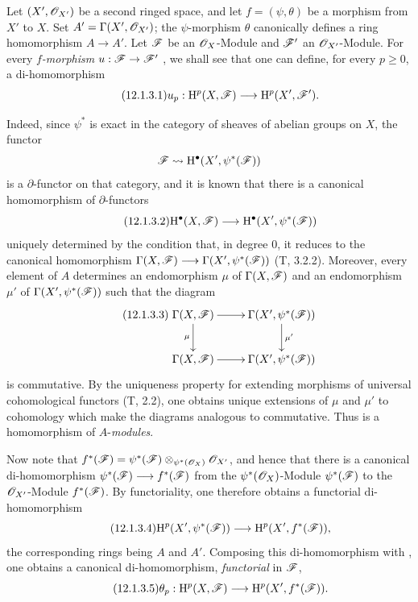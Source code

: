 \begin{env}[12.1.3]
\label{0.12.1.3}
Let $(X',\mathscr{O}_{X'})$ be a second ringed space, and let
$f=(\psi,\theta)$ be a morphism from $X'$ to $X$.
Set $A'=\Gamma(X',\mathscr{O}_{X'})$; the $\psi$-morphism $\theta$
canonically defines a ring homomorphism $A\to A'$.
Let $\mathscr{F}$ be an $\mathscr{O}_X$-Module and $\mathscr{F}'$ an
$\mathscr{O}_{X'}$-Module.
For every \emph{$f$-morphism} $u:\mathscr{F}\to\mathscr{F}'$
, we shall see that one can define,
for every $p\geq0$, a di-homomorphism
\[
\label{0.12.1.3.1}
\tag{12.1.3.1}
  u_p:\mathrm{H}^p(X,\mathscr{F})\longrightarrow\mathrm{H}^p(X',\mathscr{F}').
\]

Indeed, since $\psi^*$ is exact in the category of sheaves of abelian
groups on $X$, the functor
\[
  \mathscr{F}\leadsto\mathrm{H}^\bullet(X',\psi^*(\mathscr{F}))
\]
is a $\partial$-functor on that category, and it is known that there is a
canonical homomorphism of $\partial$-functors
\[
\label{0.12.1.3.2}
\tag{12.1.3.2}
  \mathrm{H}^\bullet(X,\mathscr{F})
  \longrightarrow
  \mathrm{H}^\bullet(X',\psi^*(\mathscr{F}))
\]
uniquely determined by the condition that, in degree $0$, it reduces
to the canonical homomorphism $\Gamma(X,\mathscr{F})
\longrightarrow
\Gamma(X',\psi^*(\mathscr{F}))$
(T, 3.2.2).
Moreover, every element of $A$ determines an endomorphism $\mu$ of
$\Gamma(X,\mathscr{F})$ and an endomorphism $\mu'$ of
$\Gamma(X',\psi^*(\mathscr{F}))$ such that the diagram
\[
\label{0.12.1.3.3}
\tag{12.1.3.3}
  \xymatrix{
    \Gamma(X,\sh{F})\ar[r]\ar[d]_\mu
      & \Gamma(X',\psi^*(\sh{F}))\ar[d]^{\mu'}\\
    \Gamma(X,\sh{F})\ar[r]
      & \Gamma(X',\psi^*(\sh{F}))
  }
\]
is commutative.
By the uniqueness property for extending morphisms of universal
cohomological functors (T, 2.2), one obtains unique extensions of
$\mu$ and $\mu'$ to cohomology which make the diagrams analogous to
 commutative.
Thus  is a homomorphism of $A$-\emph{modules}.

Now note that $f^*(\mathscr{F})
=
\psi^*(\mathscr{F})
\otimes_{\psi^*(\mathscr{O}_X)}
\mathscr{O}_{X'}$,
and hence that there is a canonical di-homomorphism $\psi^*(\mathscr{F})\longrightarrow f^*(\mathscr{F})$
from the $\psi^*(\mathscr{O}_X)$-Module $\psi^*(\mathscr{F})$ to the
$\mathscr{O}_{X'}$-Module $f^*(\mathscr{F})$.
By functoriality, one therefore obtains a functorial di-homomorphism
\[
\label{0.12.1.3.4}
\tag{12.1.3.4}
  \mathrm{H}^p(X',\psi^*(\mathscr{F}))
  \longrightarrow
  \mathrm{H}^p(X',f^*(\mathscr{F})),
\]
the corresponding rings being $A$ and $A'$.
Composing this di-homomorphism with , one obtains a
canonical di-homomorphism, \emph{functorial} in $\mathscr{F}$,
\[
\label{0.12.1.3.5}
\tag{12.1.3.5}
  \theta_p:\mathrm{H}^p(X,\mathscr{F})
  \longrightarrow
  \mathrm{H}^p(X',f^*(\mathscr{F})).
\]


\end{env}

